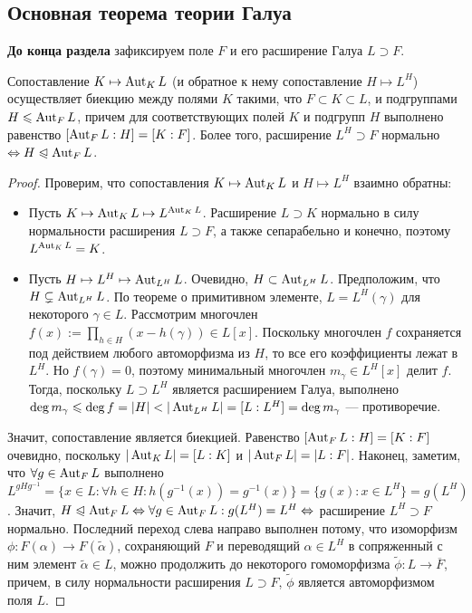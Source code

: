 \subsection{Основная теорема теории Галуа}

\textbf{До конца раздела} зафиксируем поле $F$ и его расширение Галуа $L \supset F$.

\begin{theorem}
	Сопоставление $K \mapsto \operatorname{Aut}_{K}L$ (и обратное к нему сопоставление $H \mapsto L^H$) осуществляет биекцию между полями $K$ такими, что $F \subset K \subset L$, и подгруппами $H \leqslant \operatorname{Aut}_F{L}$, причем для соответствующих полей $K$ и подгрупп $H$ выполнено равенство $[\operatorname{Aut}_FL : H] = [K : F]$. Более того, расширение $L^H \supset F$ нормально $\Leftrightarrow H \trianglelefteqslant \operatorname{Aut}_F{L}$.
\end{theorem}

\begin{proof}
	Проверим, что сопоставления $K \mapsto \operatorname{Aut}_{K}L$ и $H \mapsto L^H$ взаимно обратны:
	\begin{itemize}
		\item Пусть $K \mapsto \operatorname{Aut}_{K}L \mapsto L^{\operatorname{Aut}_{K}L}$. Расширение $L \supset K$ нормально в силу нормальности расширения $L \supset F$, а также сепарабельно и конечно, поэтому $L^{\operatorname{Aut}_K{L}} = K$.
		\item Пусть $H \mapsto L^H \mapsto \operatorname{Aut}_{L^H}L$. Очевидно, $H \subset \operatorname{Aut}_{L^H}L$. Предположим, что $H \subsetneq \operatorname{Aut}_{L^H}L$. По теореме о примитивном элементе, $L = L^H(\gamma)$ для некоторого $\gamma \in L$. Рассмотрим многочлен $f(x) := \prod_{h \in H}(x - h(\gamma)) \in L[x]$. Поскольку многочлен $f$ сохраняется под действием любого автоморфизма из $H$, то все его коэффициенты лежат в $L^H$. Но $f(\gamma) = 0$, поэтому минимальный многочлен $m_\gamma \in L^H[x]$ делит $f$. Тогда, поскольку $L \supset L^H$ является расширением Галуа, выполнено $\deg{m_\gamma} \le \deg{f} = |H| < |\Aut_{L^H}L| \hm= [L : L^H] = \deg{m_\gamma}$ --- противоречие.
	\end{itemize}
	
	Значит, сопоставление является биекцией. Равенство $[\operatorname{Aut}_FL : H] = [K : F]$ очевидно, поскольку $|\operatorname{Aut}_KL| = [L : K]$ и $|\operatorname{Aut}_FL| = |L : F|$. Наконец, заметим, что $\forall g \in \operatorname{Aut}_FL$ выполнено $L^{gHg^{-1}} = \{x \in L: \forall h \in H: h(g^{-1}(x)) = g^{-1}(x)\}= \{g(x) : x \in L^H\} = g(L^H)$. Значит, $H \trianglelefteqslant \operatorname{Aut}_FL \Leftrightarrow \forall g \in \operatorname{Aut}_FL: g(L^H) = L^H \Leftrightarrow$ расширение $L^H \supset F$ нормально. Последний переход слева направо выполнен потому, что изоморфизм $\phi: F(\alpha) \to F(\widetilde\alpha)$, сохраняющий $F$ и переводящий $\alpha \in L^H$ в сопряженный с ним элемент $\widetilde\alpha \in L$, можно продолжить до некоторого гомоморфизма $\widetilde\phi: L \to \overline{F}$, причем, в силу нормальности расширения $L \supset F$, $\widetilde\phi$ является автоморфизмом поля $L$.
\end{proof}